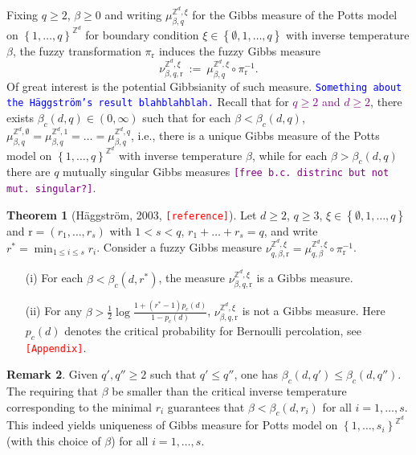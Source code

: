 \documentclass[12pt]{article}
\renewcommand{\r}{\mathrm{r}}
\newcommand{\Z}{\mathbb{Z}}
\newcommand{\set}[1]{\left\{#1\right\}}
\newcommand{\1}{\mathbbm{1}}
\newcommand{\5}{\vspace{0.5cm}}
\theoremstyle{definition}
\newtheorem{thm}{Theorem}[section]
\newtheorem{rem}[thm]{Remark}
\begin{document}
Fixing $q\geq 2$, $\beta\geq 0$ and writing $\mu_{\beta,q}^{\Z^d,\xi}$ for the Gibbs measure of the Potts model on $\set{1,\ldots,q}^{\Z^d}$ for boundary condition $\xi\in\set{\emptyset,1,\ldots,q}$ with inverse temperature $\beta$, the fuzzy transformation $\pi_\r$ induces the fuzzy Gibbs measure 
$$\nu_{\beta,q,\r}^{\Z^d,\xi} ~:=~ \mu_{\beta,q}^{\Z^d,\xi}\circ\pi_\r^{-1}.$$
Of great interest is the potential Gibbsianity of such measure. \textcolor{blue}{\texttt{Something about the H\"aggstr\"om's result blahblahblah.}} Recall that for \textcolor{purple}{$q\geq 2$ and $d\geq 2$}, there exists $\beta_c(d,q)\in(0,\infty)$ such that for each $\beta<\beta_c(d,q)$, $\mu_{\beta,q}^{\Z^d,\emptyset}=\mu_{\beta,q}^{\Z^d,1}=\ldots=\mu_{\beta,q}^{\Z^d,q}$, i.e., there is a unique Gibbs measure of the Potts model on $\set{1,\ldots,q}^{\Z^d}$ with inverse temperature $\beta$, while for each $\beta>\beta_c(d,q)$ there are $q$ mutually singular Gibbs measures \textcolor{purple}{\texttt{[free b.c.~distrinc but not mut.~singular?]}}.

\begin{thm}[H\"aggstr\"om, 2003, \textcolor{red}{\texttt{[reference]}}]
Let $d\geq 2$, $q\geq 3$, $\xi\in\set{\emptyset,1,\ldots,q}$ and $\r=(r_1,\ldots,r_s)$ with $1<s<q$, $r_1+\ldots+r_s=q$, and write $r^*=\min_{1\leq i\leq s}r_i$. Consider a fuzzy Gibbs measure $\nu_{q,\beta,\r}^{\Z^d,\xi}=\mu_{q,\beta}^{\Z^d,\xi}\circ\pi_{\r}^{-1}$.
\begin{itemize}
	\item[(i)] For each $\beta<\beta_c(d,r^*)$, the measure $\nu_{\beta,q,\r}^{\Z^d,\xi}$ is a Gibbs measure.
	\item[(ii)] For any $\beta>\frac{1}{2}\log\frac{1+(r^*-1)p_c(d)}{1-p_c(d)}$, $\nu_{\beta,q,\r}^{\Z^d,\xi}$ is not a Gibbs measure. Here $p_c(d)$ denotes the critical probability for Bernoulli percolation, see \textcolor{red}{\texttt{[Appendix]}}.
\end{itemize}
\end{thm}

\begin{rem}
Given $q',q''\geq 2$ such that $q'\leq q''$, one has $\beta_c(d,q')\leq\beta_c(d,q'')$. The requiring that $\beta$ be smaller than the critical inverse temperature corresponding to the minimal $r_i$ guarantees that $\beta<\beta_c(d,r_i)$ for all $i=1,\ldots,s$. This indeed yields uniqueness of Gibbs measure for Potts model on $\set{1,\ldots,s_i}^{\Z^d}$ (with this choice of $\beta$) for all $i=1,\ldots,s$.  
\end{rem}
\end{document}
